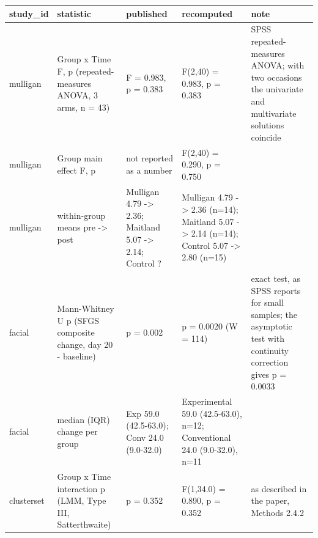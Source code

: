 {
\begin{longtable}[]{@{}
  >{\raggedright\arraybackslash}p{}
  >{\raggedright\arraybackslash}p{}
  >{\raggedright\arraybackslash}p{}
  >{\raggedright\arraybackslash}p{}
  >{\raggedright\arraybackslash}p{}@{}}
\toprule\noalign{}
\begin{minipage}[b]{\linewidth}\raggedright
study\_id
\end{minipage} & \begin{minipage}[b]{\linewidth}\raggedright
statistic
\end{minipage} & \begin{minipage}[b]{\linewidth}\raggedright
published
\end{minipage} & \begin{minipage}[b]{\linewidth}\raggedright
recomputed
\end{minipage} & \begin{minipage}[b]{\linewidth}\raggedright
note
\end{minipage} \\
\midrule\noalign{}
\endhead
\bottomrule\noalign{}
\endlastfoot
mulligan & Group x Time F, p (repeated-measures ANOVA, 3 arms, n = 43) & F = 0.983, p = 0.383 & F(2,40) = 0.983, p = 0.383 & SPSS repeated-measures ANOVA; with two occasions the univariate and multivariate solutions coincide \\
mulligan & Group main effect F, p & not reported as a number & F(2,40) = 0.290, p = 0.750 & \\
mulligan & within-group means pre -\textgreater{} post & Mulligan 4.79 -\textgreater{} 2.36; Maitland 5.07 -\textgreater{} 2.14; Control ? & Mulligan 4.79 -\textgreater{} 2.36 (n=14); Maitland 5.07 -\textgreater{} 2.14 (n=14); Control 5.07 -\textgreater{} 2.80 (n=15) & \\
facial & Mann-Whitney U p (SFGS composite change, day 20 - baseline) & p = 0.002 & p = 0.0020 (W = 114) & exact test, as SPSS reports for small samples; the asymptotic test with continuity correction gives p = 0.0033 \\
facial & median (IQR) change per group & Exp 59.0 (42.5-63.0); Conv 24.0 (9.0-32.0) & Experimental 59.0 (42.5-63.0), n=12; Conventional 24.0 (9.0-32.0), n=11 & \\
clusterset & Group x Time interaction p (LMM, Type III, Satterthwaite) & p = 0.352 & F(1,34.0) = 0.890, p = 0.352 & as described in the paper, Methods 2.4.2 \\

\end{longtable}}
